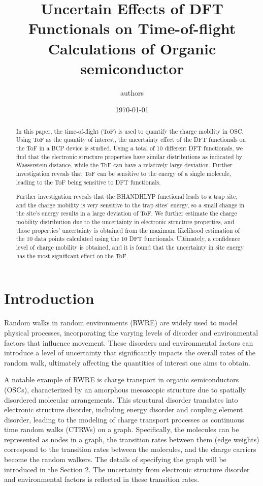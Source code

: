 \documentclass[letterpaper,12pt]{article}
\begin{document}
\linenumbers
\title{Uncertain Effects of DFT Functionals on Time-of-flight Calculations of Organic semiconductor }
\author{authors}
\date{\today}
\maketitle
\begin{abstract}
In this paper, the time-of-flight (ToF) is used to quantify the charge mobility in OSC. 
Using ToF as the quantity of interest, the uncertainty effect of the DFT functionals on the ToF in a BCP device is studied. 
Using a total of 10 different DFT functionals, we find that the electronic structure properties have similar distributions as indicated by Wasserstein distance, while the ToF can have a relatively large deviation.
Further investigation reveals that ToF can be sensitive to the energy of a single molecule, leading to the ToF being sensitive to DFT functionals.

Further investigation reveals that the BHANDHLYP functional leads to a trap site, and the charge mobility is very sensitive to the trap sites' energy, so a small change in the site's energy results in a large deviation of ToF.  
We further estimate the charge mobility distribution due to the uncertainty in electronic structure properties, and those properties' uncertainty is obtained from the maximum likelihood estimation of the 10 data points calculated using the 10 DFT functionals.
Ultimately, a confidence level of charge mobility is obtained, and it is found that the uncertainty in site energy has the most significant effect on the ToF. 
\end{abstract}

\section{Introduction}
Random walks in random environments (RWRE) are widely used to model physical processes, incorporating the varying levels of disorder and environmental factors that influence movement. 
These disorders and environmental factors can introduce a level of uncertainty that significantly impacts the overall rates of the random walk, ultimately affecting the quantities of interest one aims to obtain.


A notable example of RWRE is charge transport in organic semiconductors (OSCs), characterized by an amorphous mesoscopic structure due to spatially disordered molecular arrangements. 
This structural disorder translates into electronic structure disorder, including energy disorder and coupling element disorder, leading to the modeling of charge transport processes as continuous time random walks (CTRWs) on a graph. 
Specifically, the molecules can be represented as nodes in a graph, the transition rates between them (edge weights) correspond to the transition rates between the molecules, and the charge carriers become the random walkers. The details of specifying the graph will be introduced in the Section 2. The uncertainty from electronic structure disorder and environmental factors is reflected in these transition rates.
\end{document}
